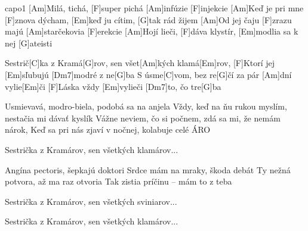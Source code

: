 \hfill capo1
[Am]Milá, tichá, [F]super pichá [Am]infúzie [F]injekcie
[Am]Keď je pri mne [F]znova dýcham, [Em]keď ju cítim, [G]tak rád žijem
[Am]Od jej čaju [F]zrazu majú [Am]starčekovia [F]erekcie
[Am]Hojí lieči, [F]dáva klystír, [Em]modlia sa k nej [G]ateisti

Sestrič[C]ka z Kramá[G]rov, sen všet[Am]kých klamá[Em]rov,
[F]Ktorí jej [Em]sľubujú [Dm7]modré z ne[G]ba
S úsme[C]vom, bez re[G]\null čí za pár [Am]dní vylie[Em]\null či
[F]Láska vždy [Em]vylieči [Dm7]to, čo tre[G]ba

Usmievavá, modro-biela, podobá sa na anjela
Vždy, keď na ňu rukou myslím, nestačia mi dávať kyslík
Vážne neviem, čo si počnem, zdá sa mi, že nemám nárok,
Keď sa pri nás zjaví v nočnej, kolabuje celé ÁRO

Sestrička z Kramárov, sen všetkých klamárov...

Angína pectoris, šepkajú doktori
Srdce mám na mraky, škoda debát
Ty nežná potvora, až ma raz otvoria
Tak zistia príčinu – mám to z teba

Sestrička z Kramárov, sen všetkých sviniarov...

Sestrička z Kramárov, sen všetkých klamárov...


